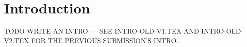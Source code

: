 
\section{Introduction}
\label{sec:intro}

TODO WRITE AN INTRO --- SEE INTRO-OLD-V1.TEX AND INTRO-OLD-V2.TEX FOR THE
PREVIOUS SUBMISSION'S INTRO.
